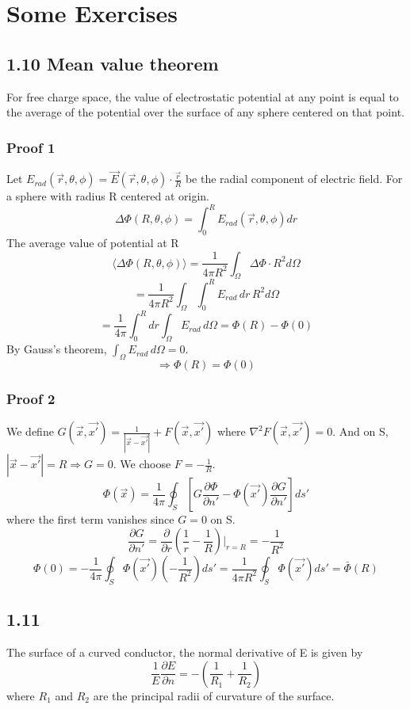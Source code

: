 \documentclass[12pt, a4paper]{article}
\begin{document}
	\section*{Some Exercises}
	
	\subsection*{1.10 Mean value theorem}
	For free charge space, the value of electrostatic potential at any point is equal to the average of the potential over the surface of any sphere centered on that point.
	
	\subsubsection*{Proof 1}
	Let $E_{rad}(\vec{r}, \theta, \phi) = \vec{E}(\vec{r}, \theta, \phi) \cdot \frac{\vec{r}}{R}$ be the radial component of electric field.
	For a sphere with radius R centered at origin.
	\[ \Delta \Phi(R, \theta, \phi) = \int_0^R E_{rad}(\vec{r}, \theta, \phi) dr \]
	The average value of potential at R
	\[ \langle \Delta \Phi(R, \theta, \phi) \rangle = \frac{1}{4\pi R^2} \int_\Omega \Delta \Phi \cdot R^2 d\Omega \]
	\[ = \frac{1}{4\pi R^2} \int_\Omega \int_0^R E_{rad} \, dr \, R^2 d\Omega \]
	\[ = \frac{1}{4\pi} \int_0^R dr \int_\Omega E_{rad} \, d\Omega = \Phi(R) - \Phi(0) \]
	By Gauss's theorem, $\int_\Omega E_{rad} \, d\Omega = 0$.
	\[ \Rightarrow \Phi(R) = \Phi(0) \]
	
	\subsubsection*{Proof 2}
	We define $G(\vec{x}, \vec{x'}) = \frac{1}{|\vec{x}-\vec{x'}|} + F(\vec{x}, \vec{x'})$ where $\nabla^2 F(\vec{x}, \vec{x'}) = 0$. And on S, $|\vec{x}-\vec{x'}| = R \Rightarrow G=0$.
	We choose $F = -\frac{1}{R}$.
	\[ \Phi(\vec{x}) = \frac{1}{4\pi} \oint_S \left[ G \frac{\partial \Phi}{\partial n'} - \Phi(\vec{x'}) \frac{\partial G}{\partial n'} \right] ds' \]
	where the first term vanishes since $G=0$ on S.
	\[ \frac{\partial G}{\partial n'} = \frac{\partial}{\partial r} \left( \frac{1}{r} - \frac{1}{R} \right) \Big|_{r=R} = -\frac{1}{R^2} \]
	\[ \Phi(0) = - \frac{1}{4\pi} \oint_S \Phi(\vec{x'}) \left( -\frac{1}{R^2} \right) ds' = \frac{1}{4\pi R^2} \oint_S \Phi(\vec{x'}) ds' = \bar{\Phi}(R) \]
	
	\subsection*{1.11}
	The surface of a curved conductor, the normal derivative of E is given by
	\[ \frac{1}{E} \frac{\partial E}{\partial n} = - \left( \frac{1}{R_1} + \frac{1}{R_2} \right) \]
	where $R_1$ and $R_2$ are the principal radii of curvature of the surface.
	
\end{document}
